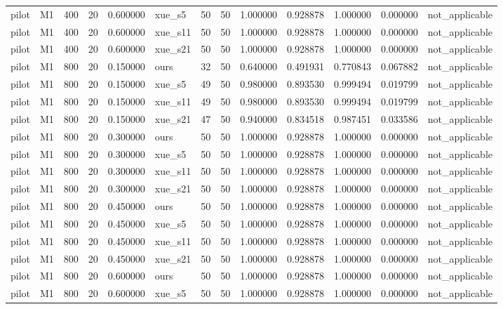 \begin{longtable}{llrrrlrrrrrrl}
pilot & M1 & 400 & 20 & 0.600000 & xue\_s5 & 50 & 50 & 1.000000 & 0.928878 & 1.000000 & 0.000000 & not\_applicable \\
pilot & M1 & 400 & 20 & 0.600000 & xue\_s11 & 50 & 50 & 1.000000 & 0.928878 & 1.000000 & 0.000000 & not\_applicable \\
pilot & M1 & 400 & 20 & 0.600000 & xue\_s21 & 50 & 50 & 1.000000 & 0.928878 & 1.000000 & 0.000000 & not\_applicable \\
pilot & M1 & 800 & 20 & 0.150000 & ours & 32 & 50 & 0.640000 & 0.491931 & 0.770843 & 0.067882 & not\_applicable \\
pilot & M1 & 800 & 20 & 0.150000 & xue\_s5 & 49 & 50 & 0.980000 & 0.893530 & 0.999494 & 0.019799 & not\_applicable \\
pilot & M1 & 800 & 20 & 0.150000 & xue\_s11 & 49 & 50 & 0.980000 & 0.893530 & 0.999494 & 0.019799 & not\_applicable \\
pilot & M1 & 800 & 20 & 0.150000 & xue\_s21 & 47 & 50 & 0.940000 & 0.834518 & 0.987451 & 0.033586 & not\_applicable \\
pilot & M1 & 800 & 20 & 0.300000 & ours & 50 & 50 & 1.000000 & 0.928878 & 1.000000 & 0.000000 & not\_applicable \\
pilot & M1 & 800 & 20 & 0.300000 & xue\_s5 & 50 & 50 & 1.000000 & 0.928878 & 1.000000 & 0.000000 & not\_applicable \\
pilot & M1 & 800 & 20 & 0.300000 & xue\_s11 & 50 & 50 & 1.000000 & 0.928878 & 1.000000 & 0.000000 & not\_applicable \\
pilot & M1 & 800 & 20 & 0.300000 & xue\_s21 & 50 & 50 & 1.000000 & 0.928878 & 1.000000 & 0.000000 & not\_applicable \\
pilot & M1 & 800 & 20 & 0.450000 & ours & 50 & 50 & 1.000000 & 0.928878 & 1.000000 & 0.000000 & not\_applicable \\
pilot & M1 & 800 & 20 & 0.450000 & xue\_s5 & 50 & 50 & 1.000000 & 0.928878 & 1.000000 & 0.000000 & not\_applicable \\
pilot & M1 & 800 & 20 & 0.450000 & xue\_s11 & 50 & 50 & 1.000000 & 0.928878 & 1.000000 & 0.000000 & not\_applicable \\
pilot & M1 & 800 & 20 & 0.450000 & xue\_s21 & 50 & 50 & 1.000000 & 0.928878 & 1.000000 & 0.000000 & not\_applicable \\
pilot & M1 & 800 & 20 & 0.600000 & ours & 50 & 50 & 1.000000 & 0.928878 & 1.000000 & 0.000000 & not\_applicable \\
pilot & M1 & 800 & 20 & 0.600000 & xue\_s5 & 50 & 50 & 1.000000 & 0.928878 & 1.000000 & 0.000000 & not\_applicable \\

\end{longtable}
